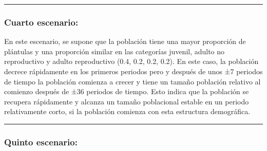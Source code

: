 \documentclass[
  12pt,
  letterpaper,
]{book}
\newenvironment{Shaded}{\begin{snugshade}}{\end{snugshade}}
\newcommand{\AttributeTok}[1]{\textcolor[rgb]{0.40,0.45,0.13}{#1}}
\newcommand{\CommentTok}[1]{\textcolor[rgb]{0.37,0.37,0.37}{#1}}
\newcommand{\DecValTok}[1]{\textcolor[rgb]{0.68,0.00,0.00}{#1}}
\newcommand{\FunctionTok}[1]{\textcolor[rgb]{0.28,0.35,0.67}{#1}}
\newcommand{\NormalTok}[1]{\textcolor[rgb]{0.00,0.23,0.31}{#1}}
\newcommand{\OtherTok}[1]{\textcolor[rgb]{0.00,0.23,0.31}{#1}}
\newcommand{\SpecialCharTok}[1]{\textcolor[rgb]{0.37,0.37,0.37}{#1}}
\begin{document}
\begin{center}\rule{0.5\linewidth}{0.5pt}\end{center}

\subsubsection{Cuarto escenario:}\label{cuarto-escenario}

En este escenario, se supone que la población tiene una mayor proporción
de plántulas y una proporción similar en las categorías juvenil, adulto
no reproductivo y adulto reproductivo (0.4, 0.2, 0.2, 0.2). En este
caso, la población decrece rápidamente en los primeros periodos pero y
después de unos ±7 periodos de tiempo la población comienza a crecer y
tiene un tamaño población relativo al comienzo después de ±36 periodos
de tiempo. Esto indica que la población se recupera rápidamente y
alcanza un tamaño poblacional estable en un periodo relativamente corto,
si la población comienza con esta estructura demográfica.

\begin{Shaded}
\end{Shaded}

\begin{center}\rule{0.5\linewidth}{0.5pt}\end{center}

\subsubsection{Quinto escenario:}\label{quinto-escenario}
\end{document}
